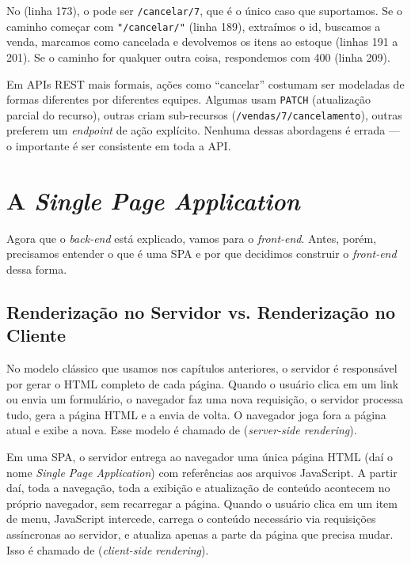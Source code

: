 No  (linha 173), o  pode ser \texttt{/cancelar/7}, que é o único caso que suportamos. Se o caminho começar com \texttt{"/cancelar/"} (linha 189), extraímos o id, buscamos a venda, marcamos como cancelada e devolvemos os itens ao estoque (linhas 191 a 201). Se o caminho for qualquer outra coisa, respondemos com 400 (linha 209).

\begin{saibaMais}
    Em APIs REST mais formais, ações como ``cancelar'' costumam ser modeladas de formas diferentes por diferentes equipes. Algumas usam \texttt{PATCH} (atualização parcial do recurso), outras criam sub-recursos (\texttt{/vendas/7/cancelamento}), outras preferem um \textit{endpoint} de ação explícito. Nenhuma dessas abordagens é errada --- o importante é ser consistente em toda a API.
\end{saibaMais}


\section{A \textit{Single Page Application}}

Agora que o \textit{back-end} está explicado, vamos para o \textit{front-end}. Antes, porém, precisamos entender o que é uma SPA e por que decidimos construir o \textit{front-end} dessa forma.

\subsection{Renderização no Servidor vs. Renderização no Cliente}

No modelo clássico que usamos nos capítulos anteriores, o servidor é responsável por gerar o HTML completo de cada página. Quando o usuário clica em um link ou envia um formulário, o navegador faz uma nova requisição, o servidor processa tudo, gera a página HTML e a envia de volta. O navegador joga fora a página atual e exibe a nova. Esse modelo é chamado de  (\textit{server-side rendering}).

Em uma SPA, o servidor entrega ao navegador uma única página HTML (daí o nome \textit{Single Page Application}) com referências aos arquivos JavaScript. A partir daí, toda a navegação, toda a exibição e atualização de conteúdo acontecem no próprio navegador, sem recarregar a página. Quando o usuário clica em um item de menu, JavaScript intercede, carrega o conteúdo necessário via requisições assíncronas ao servidor, e atualiza apenas a parte da página que precisa mudar. Isso é chamado de  (\textit{client-side rendering}).

